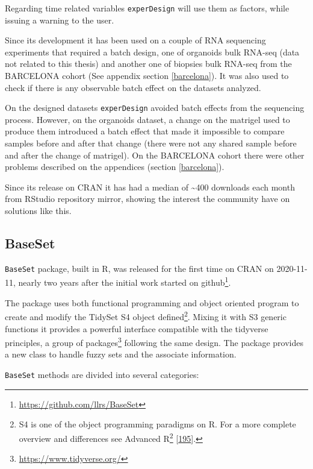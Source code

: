 \documentclass[
  a4paper,
]{book}
\DeclareRobustCommand{\href}[2]{#2\footnote{\url{#1}}}
\begin{document}
Regarding time related variables \texttt{experDesign} will use them as factors, while issuing a warning to the user.

Since its development it has been used on a couple of RNA sequencing experiments that required a batch design, one of organoids bulk RNA-seq (data not related to this thesis) and another one of biopsies bulk RNA-seq from the BARCELONA cohort (See appendix section \ref{barcelona}).
It was also used to check if there is any observable batch effect on the datasets analyzed.

On the designed datasets \texttt{experDesign} avoided batch effects from the sequencing process.
However, on the organoids dataset, a change on the matrigel used to produce them introduced a batch effect that made it impossible to compare samples before and after that change (there were not any shared sample before and after the change of matrigel).
On the BARCELONA cohort there were other problems described on the appendices (section \ref{barcelona}).

Since its release on CRAN it has had a median of \textasciitilde400 downloads each month from RStudio repository mirror, showing the interest the community have on solutions like this.

\hypertarget{baseset-1}{%
\subsection{BaseSet}\label{baseset-1}}

\texttt{BaseSet} package, built in R, was released for the first time on CRAN on 2020-11-11, nearly two years after the initial work started on \href{https://github.com/llrs/BaseSet}{github}.

The package uses both functional programming and object oriented program to create and modify the TidySet S4 object defined\footnote{S4 is one of the object programming paradigms on R.
  For a more complete overview and differences see \href{https://adv-r.hadley.nz/oo.html}{Advanced R} {[}\protect\hyperlink{ref-wickham2019}{195}{]}.}.
Mixing it with S3 generic functions it provides a powerful interface compatible with the tidyverse principles, a \href{https://www.tidyverse.org/}{group of packages} following the same design.
The package provides a new class to handle fuzzy sets and the associate information.

\texttt{BaseSet} methods are divided into several categories:
\end{document}
